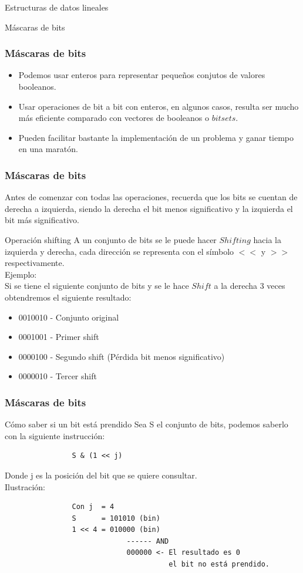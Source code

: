\documentclass{beamer}
\begin{document}
\begin{section}{Estructuras de datos lineales}
\begin{subsection}{Máscaras de bits}
	\begin{frame}[fragile]
		\frametitle{Máscaras de bits}
		\begin{itemize}
			\item {Podemos usar enteros para representar pequeños conjutos de valores booleanos.}
			\item {Usar operaciones de bit a bit con enteros, en algunos casos, resulta ser mucho más eficiente comparado con vectores de booleanos o $bitsets$.}
			\item {Pueden facilitar bastante la implementación de un problema y ganar tiempo en una maratón.}
		\end{itemize}
	\end{frame}

	\begin{frame}[fragile]
		\frametitle{Máscaras de bits}
		Antes de comenzar con todas las operaciones, recuerda que los bits se cuentan de derecha a izquierda, siendo la derecha el bit menos significativo y la izquierda el bit más significativo.
		\begin{block}{Operación shifting}
			A un conjunto de bits se le puede hacer $Shifting$ hacia la izquierda y derecha, cada dirección se representa con el símbolo $<<$ y $>>$ respectivamente.\\
		Ejemplo:\\
		Si se tiene el siguiente conjunto de bits y se le hace $Shift$ a la derecha 3 veces obtendremos el siguiente resultado:\\
			\begin{itemize}
				\item{0010010} - Conjunto original
				\item{0001001} - Primer shift
				\item{0000100} - Segundo shift (Pérdida bit menos significativo)
				\item{0000010} - Tercer shift
			\end{itemize}
		\end{block}		
	\end{frame}

	\begin{frame}[fragile]
		\frametitle{Máscaras de bits}
		\begin{block}{Cómo saber si un bit está prendido}
			Sea S el conjunto de bits, podemos saberlo con la siguiente instrucción:
			\begin{verbatim}
				S & (1 << j)
			\end{verbatim}
			Donde j es la posición del bit que se quiere consultar.\\
			Ilustración:
			\begin{verbatim}
				Con j  = 4
				S      = 101010 (bin)
				1 << 4 = 010000 (bin)
					         ------ AND
					         000000 <- El resultado es 0
					                   el bit no está prendido.
			\end{verbatim}		
		\end{block}		
	\end{frame}


\end{subsection}
\end{section}
\end{document}
